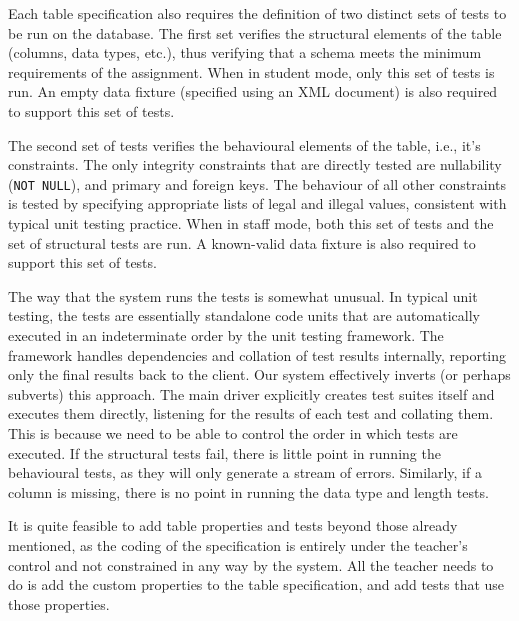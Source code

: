 \documentclass[sigconf, authordraft, capitalise]{acmart}
\begin{document}
Each table specification also requires the definition of two distinct sets of tests to be run on the database. The first set verifies the structural elements of the table (columns, data types, etc.), thus verifying that a schema meets the minimum requirements of the assignment. When in student mode, only this set of tests is run. An empty data fixture (specified using an XML document) is also required to support this set of tests.

The second set of tests verifies the behavioural elements of the table, i.e., it's constraints. The only integrity constraints that are directly tested are nullability (\texttt{NOT NULL}), and primary and foreign keys. The behaviour of all other constraints is tested by specifying appropriate lists of legal and illegal values, consistent with typical unit testing practice. When in staff mode, both this set of tests and the set of structural tests are run. A known-valid data fixture is also required to support this set of tests.

The way that the system runs the tests is somewhat unusual. In typical unit testing, the tests are essentially standalone code units that are automatically executed in an indeterminate order by the unit testing framework. The framework handles dependencies and collation of test results internally, reporting only the final results back to the client. Our system effectively inverts (or perhaps subverts) this approach. The main driver explicitly creates test suites itself and executes them directly, listening for the results of each test and collating them. This is because we need to be able to control the order in which tests are executed. If the structural tests fail, there is little point in running the behavioural tests, as they will only generate a stream of errors. Similarly, if a column is missing, there is no point in running the data type and length tests.

It is quite feasible to add table properties and tests beyond those already mentioned, as the coding of the specification is entirely under the teacher's control and not constrained in any way by the system. All the teacher needs to do is add the custom properties to the table specification, and add tests that use those properties.


\end{document}
